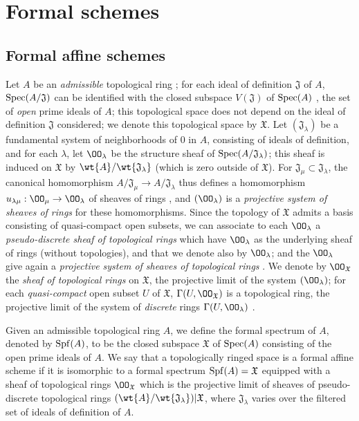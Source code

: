 \section{Formal schemes}
\label{section:1.10}

\subsection{Formal affine schemes}
\label{subsection:1.10.1}

\begin{env}[10.1.1]
\label{1.10.1.1}
Let $A$ be an \emph{admissible} topological ring ; for each ideal of definition $\mathfrak{J}$ of $A$, $\operatorname{Spec}(A/\mathfrak{J})$ can be identified with the closed subspace $V(\mathfrak{J})$ of $\operatorname{Spec}(A)$ , the set of \emph{open} prime ideals of $A$; this topological space does not depend
on the ideal of definition $\mathfrak{J}$ considered; we denote this topological space by $\mathfrak{X}$. Let $(\mathfrak{J}_\lambda)$ be a fundamental system of neighborhoods of $0$ in $A$, consisting of ideals of definition, and for each $\lambda$, let $\OO_\lambda$ be the structure sheaf of $\operatorname{Spec}(A/\mathfrak{J}_\lambda)$; this sheaf is induced on $\mathfrak{X}$ by $\wt{A}/\wt{\mathfrak{J}_\lambda}$ (which is zero outside of $\mathfrak{X}$).
For $\mathfrak{J}_\mu\subset\mathfrak{J}_\lambda$, the canonical homomorphism $A/\mathfrak{J}_\mu\to A/\mathfrak{J}_\lambda$ thus defines a homomorphism $u_{\lambda\mu}:\OO_\mu\to\OO_\lambda$ of sheaves of rings , and $(\OO_\lambda)$ is a \emph{projective system of sheaves of rings} for these homomorphisms.
Since the topology of $\mathfrak{X}$ admits a basis consisting of quasi-compact open subsets, we can associate to each $\OO_\lambda$ a \emph{pseudo-discrete sheaf of topological rings}  which have $\OO_\lambda$ as the underlying sheaf of rings (without topologies), and that we denote also by $\OO_\lambda$; and the $\OO_\lambda$ give again a \emph{projective system of sheaves of topological rings} .
We denote by $\OO_\mathfrak{X}$ the \emph{sheaf of topological rings} on $\mathfrak{X}$, the projective limit of the system $(\OO_\lambda)$; for each \emph{quasi-compact} open subset $U$ of $\mathfrak{X}$, $\Gamma(U,\OO_\mathfrak{X})$ is a topological ring, the projective limit of the system of \emph{discrete} rings $\Gamma(U,\OO_\lambda)$ .
\end{env}

\begin{defn}[10.1.2]
\label{1.10.1.2}
Given an admissible topological ring $A$, we define the formal spectrum of $A$, denoted by $\operatorname{Spf}(A)$, to be the closed subspace $\mathfrak{X}$ of $\operatorname{Spec}(A)$ consisting of the open prime ideals of $A$.
We say that a topologically ringed space is a formal affine scheme if it is isomorphic to a formal spectrum $\operatorname{Spf}(A)=\mathfrak{X}$ equipped with a sheaf of topological rings $\OO_\mathfrak{X}$ which is the projective limit of sheaves of pseudo-discrete topological rings $(\wt{A}/\wt{\mathfrak{J}_\lambda})|\mathfrak{X}$, where $\mathfrak{J}_\lambda$ varies over the filtered set of ideals of definition of $A$.
\end{defn}


